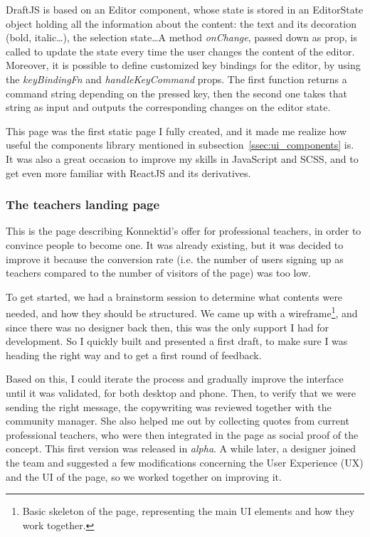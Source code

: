 DraftJS is based on an \guillemotleft{} Editor \guillemotright{} component, whose state is stored in an \guillemotleft{} EditorState \guillemotright{} object holding all the information about the content: the text and its decoration (bold, italic\ldots), the selection state\ldots A method \textit{onChange}, passed down as prop, is called to update the state every time the user changes the content of the editor. Moreover, it is possible to define customized key bindings for the editor, by using the \textit{keyBindingFn} and \textit{handleKeyCommand} props. The first function returns a command string depending on the pressed key, then the second one takes that string as input and outputs the corresponding changes on the editor state.

This page was the first static page I fully created, and it made me realize how useful the components library mentioned in {\sc subsection}~\ref{ssec:ui_components} is. It was also a great occasion to improve my skills in JavaScript and SCSS, and to get even more familiar with ReactJS and its derivatives.

\subsubsection{The teachers landing page}
\label{sssec:teachersPage}

This is the page describing Konnektid's offer for professional teachers, in order to convince people to become one. It was already existing, but it was decided to improve it because the conversion rate (i.e. the number of users signing up as teachers compared to the number of visitors of the page) was too low. 

To get started, we had a brainstorm session to determine what contents were needed, and how they should be structured. We came up with a wireframe\footnote{Basic skeleton of the page, representing the main UI elements and how they work together.}, and since there was no designer back then, this was the only support I had for development. So I quickly built and presented a first draft, to make sure I was heading the right way and to get a first round of feedback.

Based on this, I could iterate the process and gradually improve the interface until it was validated, for both desktop and phone. Then, to verify that we were sending the right message, the copywriting was reviewed together with the community manager. She also helped me out by collecting quotes from current professional teachers, who were then integrated in the page as social proof of the concept. This first version was released in \textit{alpha}. A while later, a designer joined the team and suggested a few modifications concerning the User Experience (UX) and the UI of the page, so we worked together on improving it. 

